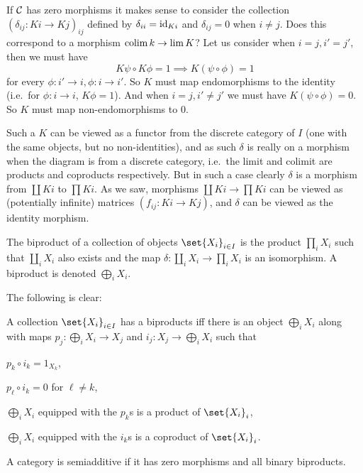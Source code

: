 If ${{\cal C}}$ has zero morphisms it makes sense to consider the collection $(\delta_{ij}\colon Ki\to Kj)_{ij}$ defined by $\delta_{ii}={\rm id}_{Ki}$ and $\delta_{ij}=0$ when $i\neq j$.
Does this correspond to a morphism $\mathop{\rm colim}\nolimits k\to\mathop{\rm lim}\nolimits K$?
Let us consider when $i=j,i'=j'$, then we must have
$$ K\psi\circ K\phi = 1 \implies K(\psi\circ\phi) = 1 $$
for every $\phi\colon i'\to i,\phi\colon i\to i'$.
So $K$ must map endomorphisms to the identity (i.e.\ for $\phi\colon i\to i$, $K\phi=1$).
And when $i=j,i'\neq j'$ we must have $K(\psi\circ\phi)=0$.
So $K$ must map non-endomorphisms to $0$.

Such a $K$ can be viewed as a functor from the discrete category of $I$ (one with the same objects, but no non-identities), and as such $\delta$ is really on a morphism
when the diagram is from a discrete category, i.e.\ the limit and colimit are products and coproducts respectively.
But in such a case clearly $\delta$ is a morphism from $\coprod Ki$ to $\prod Ki$.
As we saw, morphisms $\coprod Ki\to\prod Ki$ can be viewed as (potentially infinite) matrices $(f_{ij}\colon Ki\to Kj)$, and $\delta$ can be viewed as the identity morphism.

\bdefn

    The {\emphcolor biproduct} of a collection of objects $\set{X_i}_{i\in I}$ is the product $\prod_iX_i$ such that $\coprod_iX_i$ also exists and the map $\delta\colon\coprod_iX_i\to\prod_iX_i$
    is an isomorphism.
    A biproduct is denoted $\bigoplus_iX_i$.

\edefn

The following is clear:

\bprop

    A collection $\set{X_i}_{i\in I}$ has a biproducts iff there is an object $\bigoplus_iX_i$ along with maps $p_j\colon\bigoplus_iX_i\to X_j$ and $i_j\colon X_j\to\bigoplus_iX_i$
    such that
    \benum
        \item $p_k\circ i_k=1_{X_k}$,
        \item $p_\ell\circ i_k=0$ for $\ell\neq k$,
        \item $\bigoplus_iX_i$ equipped with the $p_k$s is a product of $\set{X_i}_i$,
        \item $\bigoplus_iX_i$ equipped with the $i_k$s is a coproduct of $\set{X_i}_i$.
    \eenum

\eprop

\bdefn

    A category is {\emphcolor semiadditive} if it has zero morphisms and all binary biproducts.

